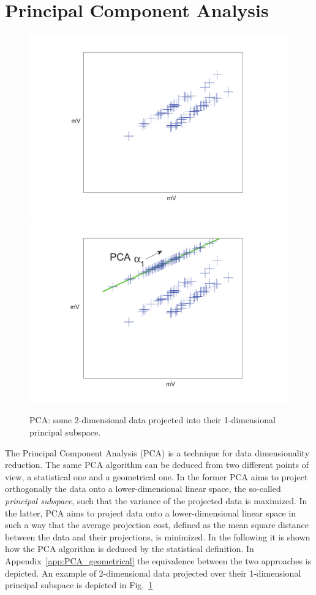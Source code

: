 
\section{Principal Component Analysis} \label{sec:PCA}
\begin{figure}
\includegraphics[width=.5\textwidth]{../Figures/PCA_LDA_geometric/PCA_unsupervised_mV2.pdf} 
\includegraphics[width=.5\textwidth]{../Figures/PCA_LDA_geometric/PCAprojection_unsupervised_mV2.pdf} 
\caption{PCA: some 2-dimensional data projected into their 1-dimensional principal subspace.}\label{fig:PCAunsupervised}
\end{figure}
The Principal Component Analysis (PCA) is a technique for data dimensionality reduction. The same PCA algorithm can be deduced from two different points of view, a statistical one and a geometrical one. In the former PCA aims to project orthogonally the data onto a lower-dimensional linear space, the so-called \emph{principal subspace}, such that the variance of the projected data is maximized. In the latter, PCA aims to project data onto a lower-dimensional linear space in such a way that the average projection cost, defined as the mean square distance between the data and their projections, is minimized. In the following it is shown how the PCA algorithm is deduced by the statistical definition. In Appendix~\ref{app:PCA_geometrical} the equivalence between the two approaches is depicted. An example of 2-dimensional data projected over their 1-dimensional principal subspace is depicted in Fig.~\ref{fig:PCAunsupervised}\\

